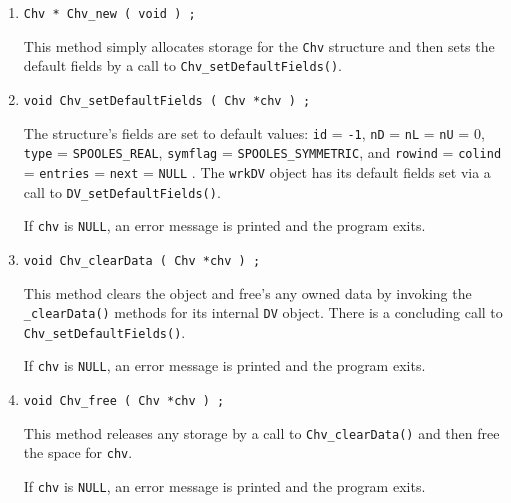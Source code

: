 \begin{enumerate}
\item
\begin{verbatim}
Chv * Chv_new ( void ) ;
\end{verbatim}
This method simply allocates storage for the {\tt Chv} structure 
and then sets the default fields by a call to 
{\tt Chv\_setDefaultFields()}.
\item
\begin{verbatim}
void Chv_setDefaultFields ( Chv *chv ) ;
\end{verbatim}
The structure's fields are set to default values:
{\tt id} = {\tt -1}, {\tt nD} = {\tt nL} = {\tt nU} = 0,
{\tt type} = {\tt SPOOLES\_REAL},
{\tt symflag} = {\tt SPOOLES\_SYMMETRIC},
and {\tt rowind} = {\tt colind} = {\tt entries} = {\tt next} 
= {\tt NULL} .
The {\tt wrkDV} object has its default fields set via a call to
{\tt DV\_setDefaultFields()}.
\par {}
If {\tt chv} is {\tt NULL},
an error message is printed and the program exits.
\item
\begin{verbatim}
void Chv_clearData ( Chv *chv ) ;
\end{verbatim}
This method clears the object and free's any owned data
by invoking the {\tt \_clearData()} methods for its internal
{\tt DV} object.
There is a concluding call to {\tt Chv\_setDefaultFields()}.
\par {}
If {\tt chv} is {\tt NULL},
an error message is printed and the program exits.
\item
\begin{verbatim}
void Chv_free ( Chv *chv ) ;
\end{verbatim}
This method releases any storage by a call to 
{\tt Chv\_clearData()} and then free the space for {\tt chv}.
\par {}
If {\tt chv} is {\tt NULL},
an error message is printed and the program exits.
\end{enumerate}
\par
